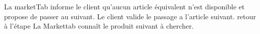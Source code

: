 \exception
\startalternatif[UGM:SA1]
  \etape La marketTab informe le client qu'aucun article équivalent n'est disponible et propose de passer au suivant.
  \etape Le client valide le passage a l'article suivant.
  \etape retour à l'étape 
\stopcondition
\postcondition La Markettab connaît le produit suivant à chercher.
\stopalternatif
\stopCU
